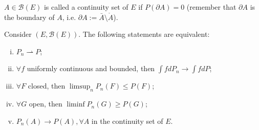 \begin{definition}
	$A \in \mathcal B(E)$ is called a continuity set of $E$
	if $P(\partial A) = 0$ (remember that $\partial A$ is the boundary of $A$, i.e.
	$\partial A := \bar A \setminus \mathring A$).
\end{definition}

\begin{theorem}
	Consider $(E, \mathcal B(E))$.
	The following statements are equivalent:
	\begin{enumerate}[(i)]
		\item $P_n \rightharpoonup P$;
		\item $\forall f$ uniformly continuous and bounded, then $\int f dP_n \to \int f dP$;
		\item $\forall F$ closed, then $\limsup_n P_n(F)\leq P(F)$;
		\item $\forall G$ open, then $\liminf P_n(G)\geq P(G)$;
		\item $P_n(A) \to P(A), \forall A$ in the continuity set of $E$.
	\end{enumerate}
	\label{thm:portmanteau}
\end{theorem}

